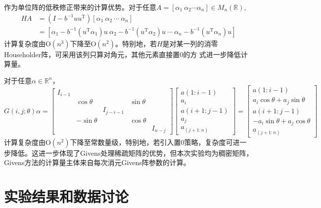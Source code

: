 \documentclass[UTF8,a4paper,10pt]{ctexart}
\begin{document}
        作为单位阵的低秩修正带来的计算优势。对于任意$A=\left[\alpha_1\ \alpha_2\cdots\alpha_n\right]\in M_n(\mathbb{R})$,
        $$
        \begin{aligned}
            HA&=\left(I-b^{-1}uu^{\mathrm{T}}\right)\left[\alpha_1\ \alpha_2\ \cdots\ \alpha_n\right] \\
            &=\left[\alpha_1-b^{-1}\left(u^{\mathrm{T}}\alpha_1\right)u\ \alpha_2-b^{-1}\left(u^{\mathrm{T}}\alpha_2\right)u \ \cdots \ \alpha_n-b^{-1}\left(u^{\mathrm{T}}\alpha_n\right)u\right]
        \end{aligned}
        $$
        计算复杂度由$\mathrm{O}(n^3)$下降至$\mathrm{O}(n^2)$。特别地，若$H$是对某一列的消零Householder阵，可采用该列只算对角元，其他元素直接置0的方
        式进一步降低计算量。
        \par
        对于任意$\alpha\in\mathbb{R}^n$，
        $$
        G(i,j;\theta)\alpha=
        \begin{bmatrix}
            I_{i-1} & \ & \ & \ & \ \\
            \ & \cos\theta & \ & \sin\theta & \ \\
            \ & \ & I_{j-i-1} & \ & \ \\
            \ & -\sin\theta & \ & \cos\theta & \ \\
            \ & \ & \ & \ & I_{n-j}
        \end{bmatrix}
        \begin{bmatrix}
            a(1:i-1) \\
            a_i \\
            a(i+1:j-1) \\
            a_j \\
            a_(j+1:n)
        \end{bmatrix}
        =
        \begin{bmatrix}
            a(1:i-1) \\
            a_i\cos\theta+a_j\sin\theta \\
            a(i+1:j-1) \\
            -a_i\sin\theta+a_j\cos\theta \\
            a_(j+1:n)
        \end{bmatrix}
        $$
        计算复杂度由$\mathrm{O}(n^2)$下降至常数量级，特别地，若引入置0策略，复杂度可进一步降低。这进一步体现了Givens处理稀疏矩阵的优势，但本次实验均为稠密矩阵，Givens方法的计算量主体来自每次消元Givens阵参数的计算。
\section{实验结果和数据讨论}
\end{document}
